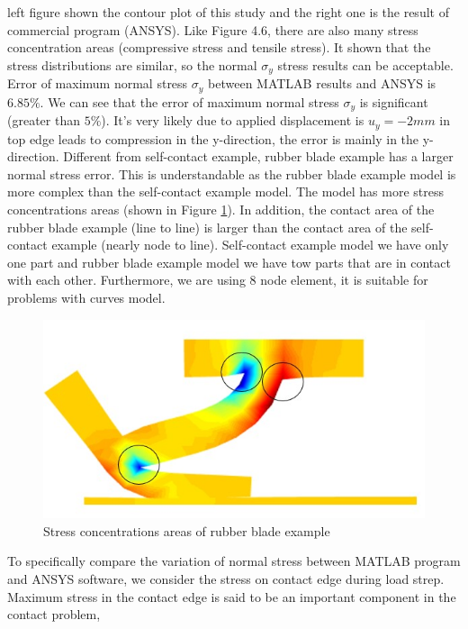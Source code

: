 left figure shown the contour plot of this study and the right one is the result of commercial
program (ANSYS). Like Figure 4.6, there are also many stress concentration areas (compressive
stress and tensile stress). It shown that the stress distributions are similar, so the normal $\sigma_y$
stress results can be acceptable.
Error of maximum normal stress $\sigma_y$ between MATLAB results and ANSYS is $6.85\%$.
We can see that the error of maximum normal stress $\sigma_y$ is significant (greater than $5\%$).
It's very likely due to applied displacement is $u_y = - 2 mm$ in top edge leads to compression in the y-direction, the error is mainly in the y-direction.
\vspace{0.38cm}
\newline 
Different from self-contact example, rubber blade example has a larger normal stress error.
This is understandable as the rubber blade example model is more complex than the self-contact example model. The model has more stress concentrations areas (shown in Figure \ref{fig:s_tt}).
In addition, the contact area of the rubber blade example (line to line) is larger than the contact area of the self-contact example (nearly node to line).
Self-contact example model we have only one part and rubber blade example model we have tow parts that are in contact with each other.
Furthermore, we are using 8 node element, it is suitable for problems with curves model.
\begin{figure}[H]
    \centering
    \includegraphics[scale=0.7]{Figures/s_tt.jpg}
    \decoRule
    \caption{Stress concentrations areas of rubber blade example}
    \label{fig:s_tt}
\end{figure} \noindent
To specifically compare the variation of normal stress between MATLAB program and ANSYS software,
we consider the stress on contact edge during load strep.
Maximum stress in the contact edge is said to be an important component in the contact problem,
